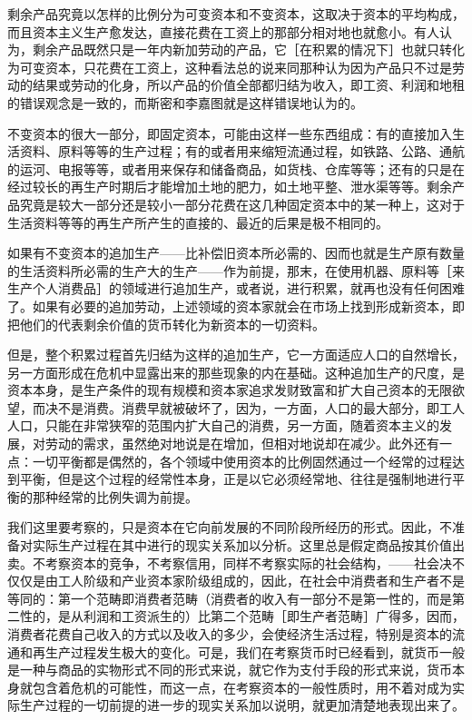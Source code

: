 剩余产品究竟以怎样的比例分为可变资本和不变资本，这取决于资本的平均构成，而且资本主义生产愈发达，直接花费在工资上的那部分相对地也就愈小。有人认为，剩余产品既然只是一年内新加劳动的产品，它［在积累的情况下］也就只转化为可变资本，只花费在工资上，这种看法总的说来同那种认为因为产品只不过是劳动的结果或劳动的化身，所以产品的价值全部都归结为收入，即工资、利润和地租的错误观念是一致的，而斯密和李嘉图就是这样错误地认为的。

不变资本的很大一部分，即固定资本，可能由这样一些东西组成：有的直接加入生活资料、原料等等的生产过程；有的或者用来缩短流通过程，如铁路、公路、通航的运河、电报等等，或者用来保存和储备商品，如货栈、仓库等等；还有的只是在经过较长的再生产时期后才能增加土地的肥力，如土地平整、泄水渠等等。剩余产品究竟是较大一部分还是较小一部分花费在这几种固定资本中的某一种上，这对于生活资料等等的再生产所产生的直接的、最近的后果是极不相同的。


如果有不变资本的追加生产——比补偿旧资本所必需的、因而也就是生产原有数量的生活资料所必需的生产大的生产——作为前提，那末，在使用机器、原料等［来生产个人消费品］的领域进行追加生产，或者说，进行积累，就再也没有任何困难了。如果有必要的追加劳动，上述领域的资本家就会在市场上找到形成新资本，即把他们的代表剩余价值的货币转化为新资本的一切资料。

但是，整个积累过程首先归结为这样的追加生产，它一方面适应人口的自然增长，另一方面形成在危机中显露出来的那些现象的内在基础。这种追加生产的尺度，是资本本身，是生产条件的现有规模和资本家追求发财致富和扩大自己资本的无限欲望，而决不是消费。消费早就被破坏了，因为，一方面，人口的最大部分，即工人人口，只能在非常狭窄的范围内扩大自己的消费，另一方面，随着资本主义的发展，对劳动的需求，虽然绝对地说是在增加，但相对地说却在减少。此外还有一点：一切平衡都是偶然的，各个领域中使用资本的比例固然通过一个经常的过程达到平衡，但是这个过程的经常性本身，正是以它必须经常地、往往是强制地进行平衡的那种经常的比例失调为前提。

我们这里要考察的，只是资本在它向前发展的不同阶段所经历的形式。因此，不准备对实际生产过程在其中进行的现实关系加以分析。这里总是假定商品按其价值出卖。不考察资本的竞争，不考察信用，同样不考察实际的社会结构，——社会决不仅仅是由工人阶级和产业资本家阶级组成的，因此，在社会中消费者和生产者不是等同的：第一个范畴即消费者范畴（消费者的收入有一部分不是第一性的，而是第二性的，是从利润和工资派生的）比第二个范畴［即生产者范畴］广得多，因而，消费者花费自己收入的方式以及收入的多少，会使经济生活过程，特别是资本的流通和再生产过程发生极大的变化。可是，我们在考察货币时已经看到，就货币一般是一种与商品的实物形式不同的形式来说，就它作为支付手段的形式来说，货币本身就包含着危机的可能性，而这一点，在考察资本的一般性质时，用不着对成为实际生产过程的一切前提的进一步的现实关系加以说明，就更加清楚地表现出来了。


